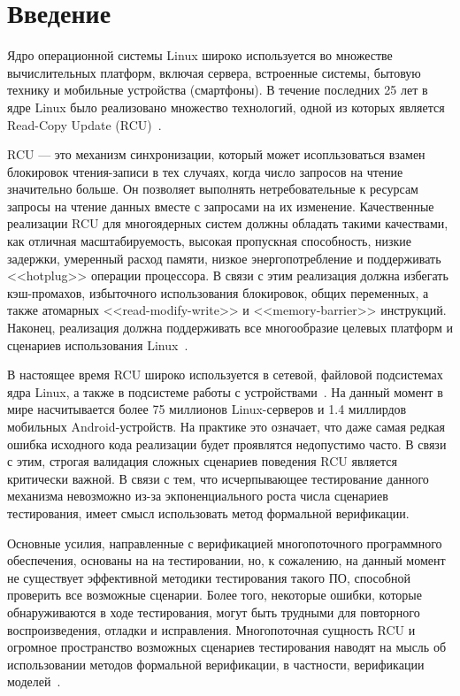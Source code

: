 \section{Введение}
Ядро операционной системы Linux широко используется во множестве
вычислительных платформ, включая сервера, встроенные системы,
бытовую технику и мобильные устройства (смартфоны).
В течение последних 25 лет в ядре Linux было реализовано
множество технологий, одной из которых является
Read-Copy Update (RCU)~\cite{McKenneyRCU98}.

RCU --- это механизм синхронизации, который может исопльзоваться
взамен блокировок чтения-записи в тех случаях,
когда число запросов на чтение значительно больше.
Он позволяет выполнять нетребовательные к ресурсам запросы на
чтение данных вместе с запросами на их изменение.
Качественные реализации RCU для многоядерных систем
должны обладать такими качествами, как отличная масштабируемость,
высокая пропускная способность, низкие задержки, умеренный расход памяти,
низкое энергопотребление и поддерживать <<hotplug>> операции процессора.
В связи с этим реализация должна избегать кэш-промахов,
избыточного использования блокировок, общих переменных,
а также атомарных <<read-modify-write>> и <<memory-barrier>> инструкций.
Наконец, реализация должна поддерживать все многообразие
целевых платформ и сценариев использования Linux~\cite{McKenneyOSR08}.

В настоящее время RCU широко используется в сетевой, файловой подсистемах
ядра Linux, а также в подсистеме работы с
устройствами~\cite{McKenneyOSR08,McKenneyRCUsageReport13}.
На данный момент в мире насчитывается более 75 миллионов
Linux-серверов и 1.4 миллирдов мобильных Android-устройств.
На практике это означает, что даже самая редкая ошибка исходного кода
реализации будет проявлятся недопустимо часто.
В связи с этим, строгая валидация сложных сценариев поведения RCU является
критически важной. В связи с тем, что исчерпывающее тестирование данного
механизма невозможно из-за экпоненциального роста числа сценариев тестирования,
имеет смысл использовать метод формальной верификации.

Основные усилия, направленные с верификацией многопоточного программного
обеспечения, основаны на на тестировании, но, к сожалению, на данный
момент не существует эффективной методики тестирования такого ПО,
способной проверить все возможные сценарии.
Более того, некоторые ошибки, которые обнаруживаются в ходе тестирования,
могут быть трудными для повторного воспроизведения, отладки и исправления.
Многопоточная сущность RCU и огромное пространство возможных сценариев
тестирования наводят на мысль об использовании методов формальной верификации,
в частности, верификации моделей~\cite{BurchInfComput92}.

